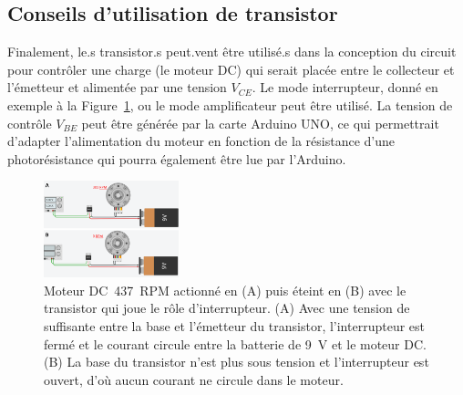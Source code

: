 \documentclass[english,french,12pt]{article}
\begin{document}
\subsection*{Conseils d'utilisation de transistor}
Finalement, le.s transistor.s peut.vent être utilisé.s dans la conception du circuit pour contrôler une charge (le moteur DC) qui serait placée entre le collecteur et l'émetteur et alimentée par une tension $V_{CE}$. Le mode interrupteur, donné en exemple à la Figure~\ref{fig:InterrupteurMoteur}, ou le mode amplificateur peut être utilisé. La tension de contrôle $V_{BE}$ peut être générée par la carte Arduino UNO, ce qui permettrait d’adapter l’alimentation du moteur en fonction de la résistance d’une photorésistance qui pourra également être lue par l’Arduino.

\begin{figure}[h]
    \centering
    \includegraphics[width=0.35\textwidth]{Projets de conception/InterrupteurMoteur.png}
    \caption{Moteur DC~437~RPM actionné en (A) puis éteint en (B) avec le transistor qui joue le rôle d'interrupteur. (A) Avec une tension de suffisante entre la base et l'émetteur du transistor, l’interrupteur est fermé et le courant circule entre la batterie de \SI{9}{\volt} et le moteur DC. (B) La base du transistor n'est plus sous tension et l'interrupteur est ouvert, d'où aucun courant ne circule dans le moteur.}
    \label{fig:InterrupteurMoteur}
\end{figure}
\end{document}
